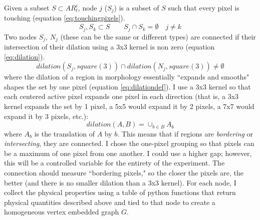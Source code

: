 Given a subset $S \subset AR_t^i$, node $j$ ($S_j$) is a subset of $S$ such that every pixel is touching (equation \ref{eq:touchingpixels}).
\begin{equation}
    S_j, S_k \subset S \qquad S_j \cap S_k = \emptyset \quad j \neq k
    \label{eq:touchingpixels}
\end{equation}
Two nodes $S_j$, $N_j$ (these can be the same or different types) are connected if their intersection of their dilation using a 3x3 kernel is non zero (equation \ref{eq:dilation}).
\begin{equation}
    dilation(S_j, square(3)) \cap dilation(N_j, square(3)) \neq \emptyset
    \label{eq:dilation}
\end{equation}
where the dilation of a region in morphology essentially ``expands and smooths" shapes the set by one pixel (equation \ref{eq:dilationdef}). I use a 3x3 kernel so that each centered active pixel expands one pixel in each direction (that is, a 3x3 kernel expands the set by 1 pixel, a 5x5 would expand it by 2 pixels, a 7x7 would expand it by 3 pixels, etc.):
\begin{equation}
    dilation(A, B) = \cup_{b\in B}A_b
    \label{eq:dilationdef}
\end{equation}
where $A_b$ is the translation of $A$ by $b$. This means that if regions are \textit{bordering} or \textit{intersecting}, they are connected. I chose the one-pixel grouping so that pixels can be a maximum of one pixel from one another. I could use a higher gap; however, this will be a controlled variable for the entirety of the experiment. The connection should measure ``bordering pixels," so the closer the pixels are, the better (and there is no smaller dilation than a 3x3 kernel). For each node, I collect the physical properties using a table of python functions that return physical quantities described above and tied to that node to create a homogeneous vertex embedded graph $G$.

